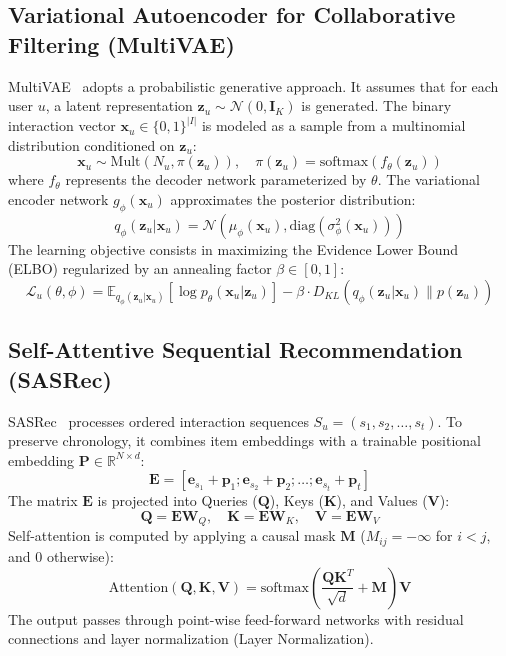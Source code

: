 \documentclass[journal]{IEEEtran}
\begin{document}
\subsection{Variational Autoencoder for Collaborative Filtering (MultiVAE)}
MultiVAE~\cite{liang2018variational} adopts a probabilistic generative approach. It assumes that for each user $u$, a latent representation $\mathbf{z}_u \sim \mathcal{N}(0, \mathbf{I}_K)$ is generated. The binary interaction vector $\mathbf{x}_u \in \{0, 1\}^{|I|}$ is modeled as a sample from a multinomial distribution conditioned on $\mathbf{z}_u$:
\begin{equation}
\mathbf{x}_u \sim \text{Mult}(N_u, \pi(\mathbf{z}_u)), \quad \pi(\mathbf{z}_u) = \text{softmax}(f_\theta(\mathbf{z}_u))
\end{equation}
where $f_\theta$ represents the decoder network parameterized by $\theta$. The variational encoder network $g_\phi(\mathbf{x}_u)$ approximates the posterior distribution:
\begin{equation}
q_\phi(\mathbf{z}_u | \mathbf{x}_u) = \mathcal{N}(\mu_\phi(\mathbf{x}_u), \text{diag}(\sigma_\phi^2(\mathbf{x}_u)))
\end{equation}
The learning objective consists in maximizing the Evidence Lower Bound (ELBO) regularized by an annealing factor $\beta \in [0, 1]$:
\begin{equation}
\mathcal{L}_u(\theta, \phi) = \mathbb{E}_{q_\phi(\mathbf{z}_u | \mathbf{x}_u)}[\log p_\theta(\mathbf{x}_u | \mathbf{z}_u)] - \beta \cdot D_{KL}(q_\phi(\mathbf{z}_u | \mathbf{x}_u) \parallel p(\mathbf{z}_u))
\end{equation}

\subsection{Self-Attentive Sequential Recommendation (SASRec)}
SASRec~\cite{kang2018self} processes ordered interaction sequences $S_u = (s_1, s_2, \dots, s_t)$. To preserve chronology, it combines item embeddings with a trainable positional embedding $\mathbf{P} \in \mathbb{R}^{N \times d}$:
\begin{equation}
\mathbf{E} = [\mathbf{e}_{s_1} + \mathbf{p}_1; \mathbf{e}_{s_2} + \mathbf{p}_2; \dots; \mathbf{e}_{s_t} + \mathbf{p}_t]
\end{equation}
The matrix $\mathbf{E}$ is projected into Queries ($\mathbf{Q}$), Keys ($\mathbf{K}$), and Values ($\mathbf{V}$):
\begin{equation}
\mathbf{Q} = \mathbf{E}\mathbf{W}_Q, \quad \mathbf{K} = \mathbf{E}\mathbf{W}_K, \quad \mathbf{V} = \mathbf{E}\mathbf{W}_V
\end{equation}
Self-attention is computed by applying a causal mask $\mathbf{M}$ ($M_{ij} = -\infty$ for $i < j$, and $0$ otherwise):
\begin{equation}
\text{Attention}(\mathbf{Q}, \mathbf{K}, \mathbf{V}) = \text{softmax}\left(\frac{\mathbf{Q} \mathbf{K}^T}{\sqrt{d}} + \mathbf{M}\right) \mathbf{V}
\end{equation}
The output passes through point-wise feed-forward networks with residual connections and layer normalization (Layer Normalization).
\end{document}
